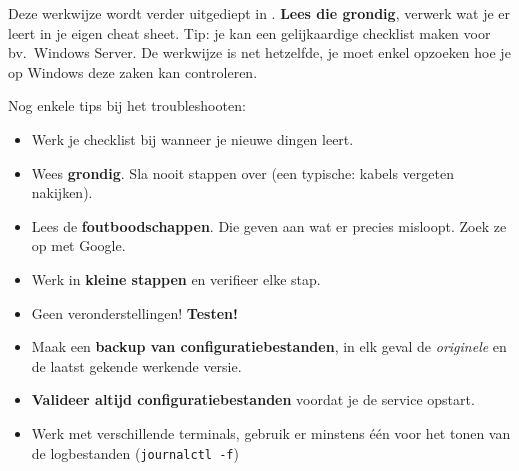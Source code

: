 Deze werkwijze wordt verder uitgediept in \textcite{VanVreckem2015}. \textbf{Lees die grondig}, verwerk wat je er leert in je eigen cheat sheet. Tip: je kan een gelijkaardige checklist maken voor bv.~Windows Server. De werkwijze is net hetzelfde, je moet enkel opzoeken hoe je op Windows deze zaken kan controleren.

Nog enkele tips bij het troubleshooten:
\begin{itemize}
  \item Werk je checklist bij wanneer je nieuwe dingen leert.
  \item Wees \textbf{grondig}. Sla nooit stappen over (een typische: kabels vergeten nakijken).
  \item Lees de \textbf{foutboodschappen}. Die geven aan wat er precies misloopt. Zoek ze op met Google.
  \item Werk in \textbf{kleine stappen} en verifieer elke stap.
  \item Geen veronderstellingen! \textbf{Testen!}
  \item Maak een \textbf{backup van configuratiebestanden}, in elk geval de \emph{originele} en de laatst gekende werkende versie.
  \item \textbf{Valideer altijd configuratiebestanden} voordat je de service opstart.
  \item Werk met verschillende terminals, gebruik er minstens één voor het tonen van de logbestanden (\texttt{journalctl -f})
\end{itemize}
